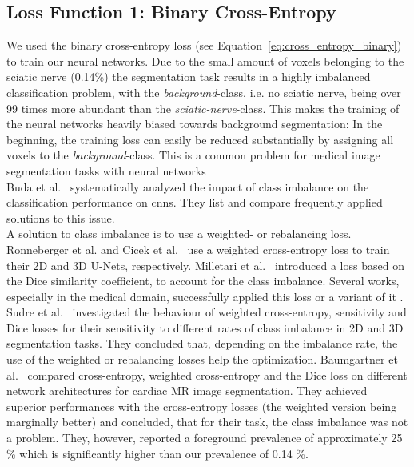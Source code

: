 \subsection{Loss Function 1: Binary Cross-Entropy}
We used the binary cross-entropy loss (see Equation~\ref{eq:cross_entropy_binary}) to train our neural networks. Due to the small amount of voxels belonging to the sciatic nerve (0.14\%) the segmentation task results in a highly imbalanced classification problem, with the \textit{background}-class, i.e. no sciatic nerve, being over 99 times more abundant than the \textit{sciatic-nerve}-class. This makes the training of the neural networks heavily biased towards background segmentation: In the beginning, the training loss can easily be reduced substantially by assigning all voxels to the \textit{background}-class. This is a common problem for medical image segmentation tasks with neural networks~\cite{Litjens2017AAnalysis,Tetteh2018DeepVesselNet:Volumes,Baumgartner2017AnSegmentation,Selvan2018ExtractionNetworks,Kayalibay2017CNN-basedData}\\
Buda et al.~\cite{BudaANetworks} systematically analyzed the impact of class imbalance on the classification performance on \acrshort{cnn}s. They list and compare frequently applied solutions to this issue.\\
A solution to class imbalance is to use a weighted- or rebalancing loss. Ronneberger et al. \cite{Ronneberger2015U-Net:Segmentation} and Cicek et al.~\cite{Cicek20163DAnnotation} use a weighted cross-entropy loss to train their 2D and 3D U-Nets, respectively. Milletari et al.~\cite{Milletari2016V-Net:Segmentation} introduced a loss based on the Dice similarity coefficient, to account for the class imbalance. Several works, especially in the medical domain, successfully applied this loss or a variant of it \cite{Selvan2018ExtractionNetworks,Kayalibay2017CNN-basedData,Drozdzal2016TheSegmentation}. Sudre et al.~\cite{Sudre2017GeneralisedSegmentations} investigated the behaviour of weighted cross-entropy, sensitivity and Dice losses for their sensitivity to different rates of class imbalance in 2D and 3D segmentation tasks. They concluded that, depending on the imbalance rate, the use of the weighted or rebalancing losses help the optimization. Baumgartner et al.~\cite{Baumgartner2017AnSegmentation} compared cross-entropy, weighted cross-entropy and the Dice loss on different network architectures for cardiac MR image segmentation. They achieved superior performances with the cross-entropy losses (the weighted version being marginally better) and concluded, that for their task, the class imbalance was not a problem. They, however, reported a foreground prevalence of approximately 25 \% which is significantly higher than our prevalence of 0.14 \%.\\
